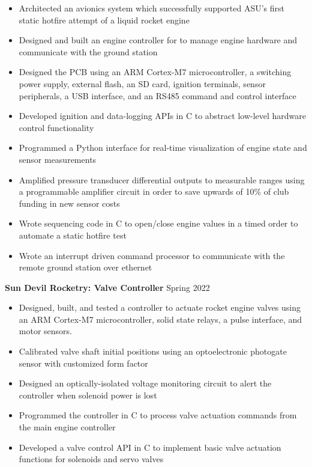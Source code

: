 \documentclass{article}
\begin{document}
\begin{itemize}
\item{Architected an avionics system which successfully supported ASU's first static hotfire attempt of a liquid rocket engine}
\item{Designed and built an engine controller for to manage engine hardware and communicate with the ground station}
\item{Designed the PCB using an ARM Cortex-M7 microcontroller, a switching power supply, external flash, an SD card, ignition terminals, sensor peripherals, a USB interface, and an RS485 command and control interface}
\item{Developed ignition and data-logging APIs in C to abstract low-level hardware control functionality}
\item{Programmed a Python interface for real-time visualization of engine state and sensor measurements}
\item{Amplified pressure transducer differential outputs to measurable ranges using a programmable amplifier circuit in order to save upwards of 10\% of club funding in new sensor costs}
\item{Wrote sequencing code in C to open/close engine values in a timed order to automate a static hotfire test }
\item{Wrote an interrupt driven command processor to communicate with the remote ground station over ethernet}
\end{itemize}
\vspace{1em}
\textbf{Sun Devil Rocketry: Valve Controller}
\hfill
\vspace{0.5em}
Spring 2022
\begin{itemize}
\item{Designed, built, and tested a controller to actuate rocket engine valves using an ARM Cortex-M7 microcontroller, solid state relays, a pulse interface, and motor sensors.}
\item{Calibrated valve shaft initial positions using an optoelectronic photogate sensor with customized form factor}
\item{Designed an optically-isolated voltage monitoring circuit to alert the controller when solenoid power is lost}
\item{Programmed the controller in C to process valve actuation commands from the main engine controller}
\item{Developed a valve control API in C to implement basic valve actuation functions for solenoids and servo valves}
\end{itemize}
\end{document}
